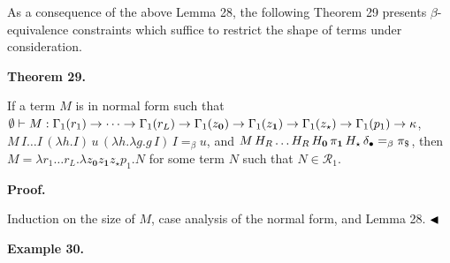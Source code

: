 \documentclass[10pt,a4paper]{amsart}
\begin{document}
 
 
As a consequence of the above Lemma 28, the following Theorem 29 presents $\beta$-equivalence constraints which suffice to restrict the shape of terms under consideration.\par
 
 
 
\par\medskip\noindent\textbf{Theorem 29.}\par
 
 
If a term $M$ is in normal form such that $\emptyset\vdash M:\Gamma_{1}(r_{1})\to\cdots\to\Gamma_{1}(r_{L})\to\Gamma_{1}(%
z_{\mathbf{0}})\to\Gamma_{1}(z_{\mathbf{1}})\to\Gamma_{1}(z_{\star})\to\Gamma_%
{1}(p_{1})\to\kappa$, $M\,I\ldots I\,(\lambda h.I)\,u\,(\lambda h.\lambda g.g\,I)\,I=_{\beta}u$, and $M\,H_{R}\ldots H_{R}\,H_{\mathbf{0}}\,\pi_{\mathbf{1}}\,H_{\star}\,\delta_{%
\bullet}=_{\beta}\pi_{\$}$, then $M=\lambda r_{1}\ldots r_{L}.\lambda z_{\mathbf{0}}z_{\mathbf{1}}z_{\star}p_{1}.N$ for some term $N$ such that $N\in\mathcal{R}_{1}$.\par
 
 
 
 
 
\par\medskip\noindent\textbf{Proof.}\par
 
 
Induction on the size of $M$, case analysis of the normal form, and Lemma 28. $\hfill\blacktriangleleft$\par
 
 
 
\par\medskip\noindent\textbf{Example 30.}\par
 
 
\end{document}
